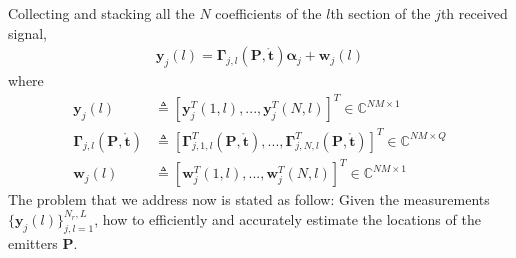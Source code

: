 \documentclass[review]{elsarticle}
\begin{document}
Collecting and stacking all the $N$ coefficients of the $l$th section of the $j$th received signal,
\begin{align}\label{y_jl}
    \boldsymbol{y}_j(l)=\boldsymbol{\Gamma}_{j,l}(\boldsymbol{P},\mathring{\boldsymbol{t}})\boldsymbol{\alpha}_j+\boldsymbol{w}_j(l)
\end{align}
where
\begin{align}\label{Gammajl}
    \boldsymbol{y}_j(l)&\triangleq[\boldsymbol{y}_j^T(1,l),...,\boldsymbol{y}_j^T(N,l)]^T\in \mathbb{C}^{NM\times 1}\\ \nonumber
    \boldsymbol{\Gamma}_{j,l}(\boldsymbol{P},\mathring{\boldsymbol{t}})&\triangleq[\boldsymbol{\Gamma}_{j,1,l}^T(\boldsymbol{P},\mathring{\boldsymbol{t}}),...,\boldsymbol{\Gamma}_{j,N,l}^T(\boldsymbol{P},\mathring{\boldsymbol{t}})]^T\in \mathbb{C}^{NM\times Q}\\ 
    \boldsymbol{w}_j(l)&\triangleq[\boldsymbol{w}_j^T(1,l),...,\boldsymbol{w}_j^T(N,l)]^T\in \mathbb{C}^{NM\times 1}\nonumber
\end{align}
The problem that we address now is stated as follow: Given the measurements $\lbrace\boldsymbol{y}_j(l)\rbrace_{j,l=1}^{N_r,L}$, how to efficiently and accurately estimate the locations of the emitters $\boldsymbol{P}$.
\end{document}
